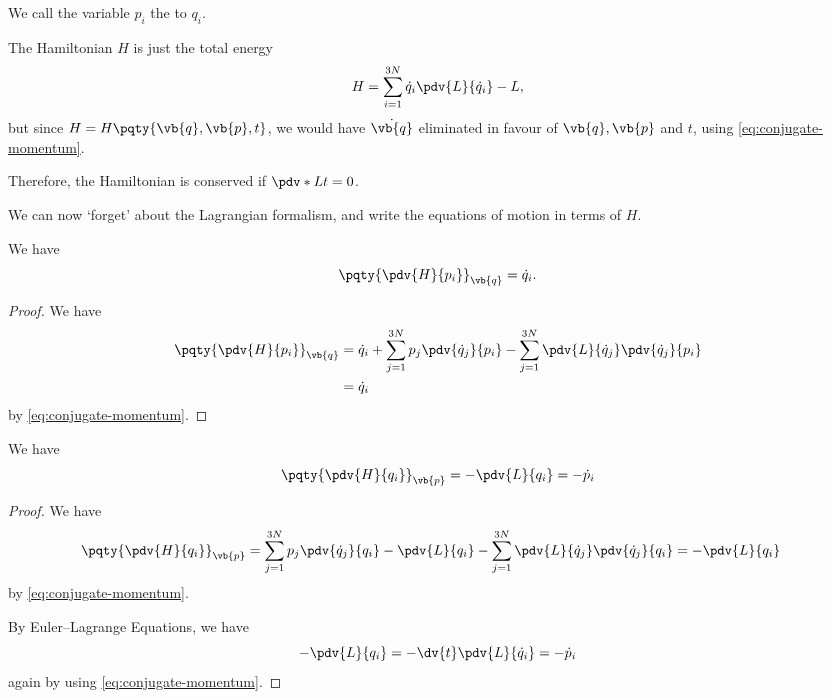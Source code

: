 \begin{definition}
    We call the variable \(p_i\) the  to \(q_i\).
\end{definition}

The Hamiltonian \(H\) is just the total energy
\[
    H = \sum_{i = 1}^{3N} \dot{q}_i \pdv{L}{\dot{q}_i} - L,
\]
but since \(H = H\pqty{\vb{q}, \vb{p}, t}\), we would have \(\dot{\vb{q}}\) eliminated in favour of \(\vb{q}, \vb{p}\) and \(t\), using \eqref{eq:conjugate-momentum}.

Therefore, the Hamiltonian is conserved if \(\pdv*{L}{t} = 0\).

We can now `forget' about the Lagrangian formalism, and write the equations of motion in terms of \(H\).

\begin{proposition}
    \label{prop:hamiltonian-diff-conjugate-momentum}%
    We have
    \[
        \pqty{\pdv{H}{p_i}}_{\vb{q}} = \dot{q}_i.
    \]
\end{proposition}

\begin{proof}
    We have
    \begin{align*}
        \pqty{\pdv{H}{p_i}}_{\vb{q}} &= \dot{q}_i + \sum_{j = 1}^{3N} p_j \pdv{\dot{q}_j}{p_i} - \sum_{j = 1}^{3N} \pdv{L}{\dot{q}_j} \pdv{\dot{q}_j}{p_i} \\
        &= \dot{q}_i
    \end{align*}
    by \eqref{eq:conjugate-momentum}.
\end{proof}

\begin{proposition}
    \label{prop:hamiltonian-diff-position}%
    We have
    \[
        \pqty{\pdv{H}{q_i}}_{\vb{p}} = - \pdv{L}{q_i} = - \dot{p}_i
    \]
\end{proposition}

\begin{proof}
    We have
    \begin{align*}
        \pqty{\pdv{H}{q_i}}_{\vb{p}} &= \sum_{j = 1}^{3N} p_j \pdv{\dot{q}_j}{q_i} - \pdv{L}{q_i} - \sum_{j = 1}^{3N} \pdv{L}{\dot{q}_j} \pdv{\dot{q}_j}{q_i} = - \pdv{L}{q_i}
    \end{align*}
    by \eqref{eq:conjugate-momentum}.

    By Euler--Lagrange Equations, we have
    \[
        - \pdv{L}{q_i} = - \dv{t} \pdv{L}{\dot{q}_i} = - \dot{p}_i
    \]
    again by using \eqref{eq:conjugate-momentum}.
\end{proof}

